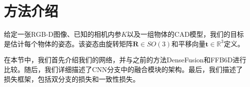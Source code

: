 \section{方法介绍}

给定一张RGB-D图像、已知的相机内参$K$以及一组物体的CAD模型，我们的目标是估计每个物体的姿态。该姿态由旋转矩阵$\mathbf{R} \in SO(3)$和平移向量$\mathbf{t} \in \mathbb{R}^3$定义。

在本节中，我们首先介绍我们的网络，并与之前的方法DenseFusion\cite{wang2019densefusion}和FFB6D\cite{he2021ffb6d}进行比较。随后，我们详细描述了CNN分支中的融合模块的架构。最后，我们描述了损失框架，包括双分支的损失和一致性损失。




